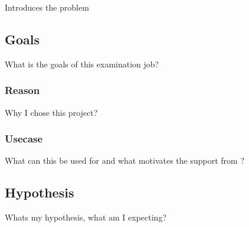 Introduces the problem

\subsection{Goals}
What is the goals of this examination job?

\subsubsection{Reason}
Why I chose this project?

\subsubsection{Usecase}
What can this be used for and what motivates the support from \company ?

\subsection{Hypothesis}
Whats my hypothesis, what am I expecting?